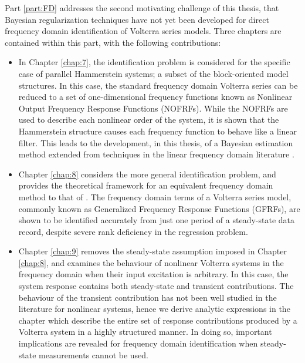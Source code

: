 Part \ref{part:FD} addresses the second motivating challenge of this thesis, that Bayesian regularization techniques have not yet been developed for direct frequency domain identification of Volterra series models. Three chapters are contained within this part, with the following contributions:
\begin{itemize}
\item In Chapter \ref{chap:7}, the identification problem is considered for the specific case of parallel Hammerstein systems; a subset of the block-oriented model structures. In this case, the standard frequency domain Volterra series can be reduced to a set of one-dimensional frequency functions known as Nonlinear Output Frequency Response Functions (NOFRFs). While the NOFRFs are used to describe each nonlinear order of the system, it is shown that the Hammerstein structure causes each frequency function to behave like a linear filter. This leads to the development, in this thesis, of a Bayesian estimation method extended from techniques in the linear frequency domain literature \cite{Lataire2016}.
\item Chapter \ref{chap:8} considers the more general identification problem, and provides the theoretical framework for an equivalent frequency domain method to that of \cite{Birpoutsoukis2017}. The frequency domain terms of a Volterra series model, commonly known as Generalized Frequency Response Functions (GFRFs), are shown to be identified accurately from just one period of a steady-state data record, despite severe rank deficiency in the regression problem.
\item Chapter \ref{chap:9} removes the steady-state assumption imposed in Chapter \ref{chap:8}, and examines the behaviour of nonlinear Volterra systems in the frequency domain when their input excitation is arbitrary. In this case, the system response contains both steady-state and transient contributions. The behaviour of the transient contribution has not been well studied in the literature for nonlinear systems, hence we derive analytic expressions in the chapter which describe the entire set of response contributions produced by a Volterra system in a highly structured manner. In doing so, important implications are revealed for frequency domain identification when steady-state measurements cannot be used.
\end{itemize}

